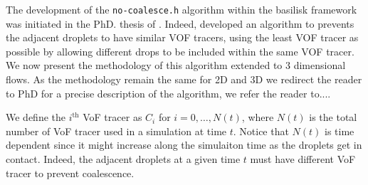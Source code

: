The development of the \texttt{no-coalesce.h} algorithm within the basilisk framework was initiated in the PhD. thesis of \citet{mani2021numerical}.
Indeed, \citet{mani2021numerical} developed an algorithm to prevents the adjacent droplets to have similar VOF tracers, using the least VOF tracer as possible by allowing different drops to be included within the same VOF tracer.
We now present the methodology of this algorithm extended to 3 dimensional flows.
As the methodology remain the same for 2D and 3D we redirect the reader to \citet{mani2021numerical} PhD for a precise description of the algorithm, we refer the reader to.... 

We define the $i^\text{th}$ VoF tracer as $C_i$ for $i =0,\ldots,N(t)$, where $N(t)$ is the total number of VoF tracer used in a simulation at time $t$.
Notice that $N(t)$ is time dependent since it might increase along the simulaiton time as the droplets get in contact. 
Indeed, the adjacent droplets at a given time $t$ must have different VoF tracer to prevent coalescence. 
